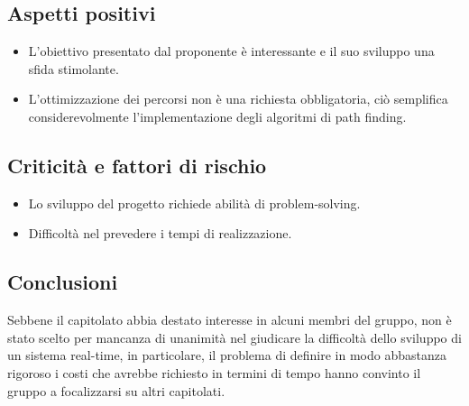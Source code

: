 \subsection{Aspetti positivi}
\begin{itemize}
	\item L'obiettivo presentato dal proponente è interessante e il suo sviluppo una sfida stimolante.
    \item L'ottimizzazione dei percorsi non è una richiesta obbligatoria, ciò semplifica considerevolmente l'implementazione degli algoritmi di path finding. 
\end{itemize}
\subsection{Criticità e fattori di rischio}
\begin{itemize}
    \item Lo sviluppo del progetto richiede abilità di problem-solving.
	\item Difficoltà nel prevedere i tempi di realizzazione.
\end{itemize}
\subsection{Conclusioni}
Sebbene il capitolato abbia destato interesse in alcuni membri del gruppo, non è stato scelto per mancanza di unanimità nel giudicare la difficoltà dello sviluppo di un sistema real-time, in particolare, il problema di definire in modo abbastanza rigoroso i costi che avrebbe richiesto in termini di tempo hanno convinto il gruppo a focalizzarsi su altri capitolati. 

